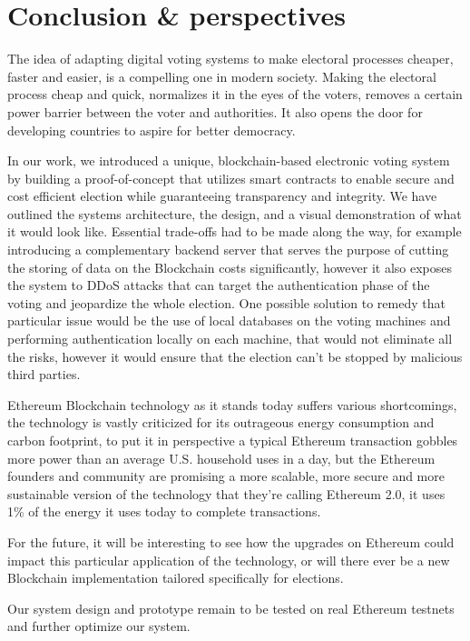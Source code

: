 \chapter{Conclusion \& perspectives}

The idea of adapting digital voting systems to make electoral processes cheaper, faster and easier, is a compelling one in modern society. Making the electoral process cheap and quick, normalizes it in the eyes of the voters, removes a certain power barrier between the voter and authorities. It also opens the door for developing countries to aspire for better democracy.

In our work, we introduced a unique, blockchain-based electronic voting system by building a proof-of-concept that utilizes smart contracts to enable secure and cost efficient election while guaranteeing transparency and integrity. We have outlined the systems architecture, the design, and a visual demonstration of what it would look like. Essential trade-offs had to be made along the way, for example introducing a complementary backend server that serves the purpose of cutting the storing of data on the Blockchain costs significantly, however it also exposes the system to DDoS attacks that can target the authentication phase of the voting and jeopardize the whole election. One possible solution to remedy that particular issue would be the use of local databases on the voting machines and performing authentication locally on each machine, that would not eliminate all the risks, however it would ensure that the election can't be stopped by malicious third parties.

Ethereum Blockchain technology as it stands today suffers various shortcomings, the technology is vastly criticized for its outrageous energy consumption and carbon footprint, to put it in perspective a typical Ethereum transaction gobbles more power than an average U.S. household uses in a day\cite{fairleyEthereumWillCut2019}, but the Ethereum founders and community are promising a more scalable, more secure and more sustainable version of the technology that they're calling Ethereum 2.0, it uses 1\% of the energy it uses today to complete transactions\cite{fairleyEthereumWillCut2019}.

For the future, it will be interesting to see how the upgrades on Ethereum could impact this particular application of the technology, or will there ever be a new Blockchain implementation tailored specifically for elections.

Our system design and prototype remain to be tested on real Ethereum \gls{testnets} and further optimize our system.